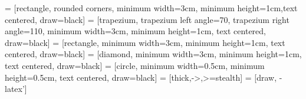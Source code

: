 
\usepackage[T1]{fontenc}               %
\usepackage[utf8x]{inputenc}           %
\usepackage{ucs}                       %
\usepackage{indentfirst}               %

\usepackage[cleanup]{gnuplottex}       %

\usepackage{graphicx}                  %
\usepackage{wrapfig}                   %
\usepackage{float}                     %
\usepackage{subcaption}                %

\usepackage{amssymb}                   %
\usepackage{amsmath}                   %
\usepackage{amsfonts}                  %


\usepackage{multirow}                  %
\usepackage{microtype}                 %
\usepackage{lipsum}                    %
\usepackage{fancyhdr}                  %
\usepackage{hyperref}                  %
\usepackage[hyphenbreaks]{breakurl}    %
\usepackage{setspace}                  %
\usepackage{mdframed}                  %
\usepackage{lettrine}				      %

\usepackage{enumitem}


\usepackage[num,overcite]{abntex2cite} %
\citebrackets[]                        %

\usepackage{geometry}                          %


\usepackage{tikz}

\usetikzlibrary{shapes.geometric, arrows}
 = [rectangle, rounded corners, minimum width=3cm, minimum height=1cm,text centered, draw=black]
 = [trapezium, trapezium left angle=70, trapezium right angle=110, minimum width=3cm, minimum height=1cm, text centered, draw=black]
 = [rectangle, minimum width=3cm, minimum height=1cm, text centered, draw=black]
 = [diamond, minimum width=3cm, minimum height=1cm, text centered, draw=black]
 = [circle, minimum width=0.5cm, minimum height=0.5cm, text centered, draw=black]
 = [thick,->,>=stealth]
 = [draw, -latex']

